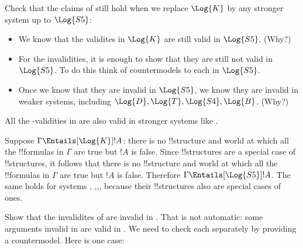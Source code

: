 \documentclass[../../../include/open-logic-section]{subfiles}
\begin{document}
\begin{prob}
    Check that the claims of  still hold when we replace $\Log{K}$
    by any stronger system up to $\Log{S5}$:
    \begin{itemize}
        \item We know that the validites in $\Log{K}$ are still valid 
        in $\Log{S5}$. (Why?)
        \item For the invalidities, it is enough to show that they are
        still not valid in $\Log{S5}$. To do this think of countermodels
        to each in $\Log{S5}$.
        \item Once we know that they are invalid in $\Log{S5}$, we know
        they are invalid in weaker systems, including
         $\Log{D},\Log{T},\Log{S4},\Log{B}$. (Why?)
    \end{itemize}

    \begin{ans}
    All the -validities in  are also valid in
    stronger systems like .

    Suppose $\Gamma\Entails[\Log{K}]!A$: there is no 
    !!{structure} and world at which all the !!{formula}s in $\Gamma$
    are true but $!A$ is false. Since  !!{structure}s are a
    special case of  !!{structure}s, it follows that there is
    no   !!{structure} and world at which all the !!{formula}s
    in $\Gamma$ are true but $!A$ is false. Therefore
    $\Gamma\Entails[\Log{S5}]!A$. The same holds for systems ,
    ,,, because their !!{structure}s also are 
    special cases of  ones.

    Show that the invalidites of  are invalid in
    . That is not automatic: some arguments invalid in 
    are valid in . We need to check each separately
    by providing a  countermodel. Here is one case:
    

\end{ans}
\end{prob}
\end{document}
